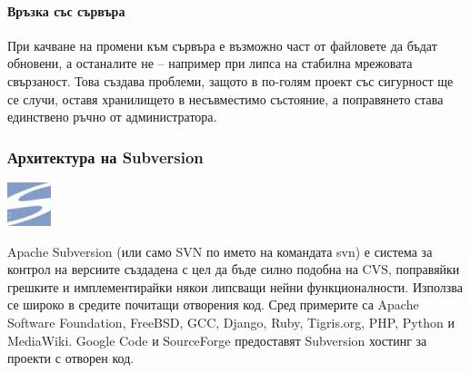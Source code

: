 \documentclass[a4paper]{article}
\begin{document}
      \paragraph{Връзка със сървъра}

      При качване на промени към сървъра е възможно част от файловете да бъдат
      обновени, а останалите не -- например при липса на стабилна мрежовата
      свързаност. Това създава проблеми, защото в по-голям проект със сигурност
      ще се случи, оставя хранилището в несъвместимо състояние, а поправянето
      става единствено ръчно от администратора.

    \subsubsection{Архитектура на Subversion}
    \includegraphics[scale=1.0]{svn_icon}
    
    Apache Subversion (или само SVN по името на командата svn) е система за
    контрол на версиите създадена с цел да бъде силно подобна на CVS,
    поправяйки грешките и имплементирайки някои липсващи нейни функционалности.
    Използва се широко в средите почитащи отворения код. Сред примерите са
    Apache Software Foundation, FreeBSD, GCC, Django, Ruby, Tigris.org, PHP,
    Python и MediaWiki. Google Code и SourceForge предоставят Subversion
    хостинг за проекти с отворен код.
\end{document}
